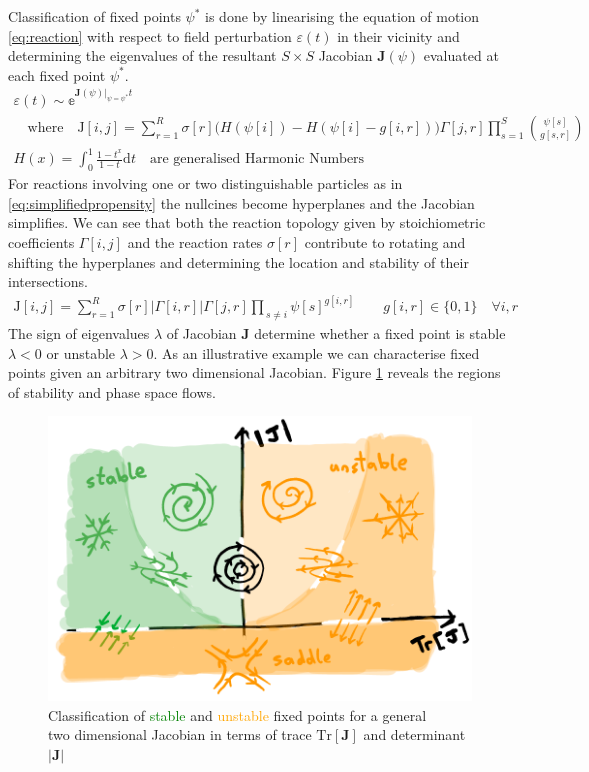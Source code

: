 Classification of fixed points $\psi^*$ is done by linearising the equation of motion
\eqref{eq:reaction} with respect to field perturbation $\varepsilon(t)$ in their vicinity
and determining the eigenvalues of the resultant $S\times S$ Jacobian $\mathbf{J}(\psi)$
evaluated at each fixed point $\psi^*$.
\begin{align}
	\varepsilon(t) \sim
	\mathbb{e}^{\mathbf{J}(\psi)|_{\psi=\psi^*}t}\qquad\qquad\qquad\qquad\qquad\qquad
	\\
	\quad\text{where}\quad
	\mathrm{J}[i,j]=
	\sum_{r=1}^R
	\sigma[r]
\bigg(H(\psi[i])-H(\psi[i]-g[i,r])\bigg)
	\Gamma[j,r]
		\prod_{s=1}^S{\psi[s] \choose g[s,r]}
	\\
	H(x)=\int_0^1\frac{1-t^x}{1-t}\mathrm{d}t\quad
	\text{are generalised Harmonic Numbers}\qquad
	\label{eq:linearstability}
\end{align}
For reactions involving one or two distinguishable particles as
in \eqref{eq:simplifiedpropensity} the nullcines become hyperplanes and the Jacobian
simplifies. We can see that both the reaction topology given by stoichiometric
coefficients $\Gamma[i,j]$ and the reaction rates $\sigma[r]$ contribute to
rotating and shifting the hyperplanes and determining the location and stability
of their intersections.
\begin{align}
	\mathrm{J}[i,j]=
	\sum_{r=1}^R
		\sigma[r]|\Gamma[i,r]|\Gamma[j,r]
		\prod_{\,s\neq i}
		\psi[s]^{g[i,r]}
		\qquad g[i,r]\in\{0,1\} \quad\forall i,r
	\label{eq:simplifiedjacobian}
\end{align}
The sign of eigenvalues $\lambda$ of Jacobian $\mathbf{J}$ determine whether a fixed point
is stable $\lambda<0$ or unstable $\lambda>0$. As an illustrative example we can characterise
fixed points given an arbitrary two dimensional Jacobian. Figure \ref{fig:stability} reveals
the regions of stability and phase space flows.
\begin{figure}[H]
\centering{}
\captionsetup{justification=centering}
\includegraphics[scale=0.35]{figures/stability}
\caption{Classification of \textcolor{Green}{stable} and \textcolor{orange}{unstable}
fixed points for a general \\two dimensional Jacobian in terms of trace $\mathrm{Tr}[\mathbf{J}]$ and
determinant $|\mathbf{J}|$}
\label{fig:stability}
\end{figure}
